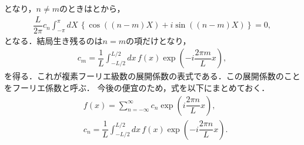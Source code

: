 となり，$n\neq m$のときはとから，
\begin{align}
 \dfrac{L}{2\pi}   c_n \int_{-\pi}^{\pi}dX\, \left\{\cos\left(\left(n-m\right)X\right) + i\sin\left(\left(n-m\right)X\right)\right\} = 0, 
\end{align}
となる．結局生き残るのは$n=m$の項だけとなり，
\begin{align}
  c_m = \dfrac{1}{L}\int_{-L/2}^{L/2}dx\,f\left(x\right)\exp\left(-i\dfrac{2\pi m}{L}x \right), 
\end{align}
を得る．これが複素フーリエ級数の展開係数の表式である．この展開係数のことをフーリエ係数と呼ぶ．
今後の便宜のため，式を以下にまとめておく．
\begin{align}
 & f\left(x\right) = \sum_{n=-\infty}^{\infty} c_{n} \exp\left(i\dfrac{2\pi n}{L}x\right), \label{complex_fourier}\\
 & c_n = \dfrac{1}{L}\int_{-L/2}^{L/2}dx\,f\left(x\right)\exp\left(-i\dfrac{2\pi n}{L}x \right). \label{complex_fourier_coef}
\end{align}
%
